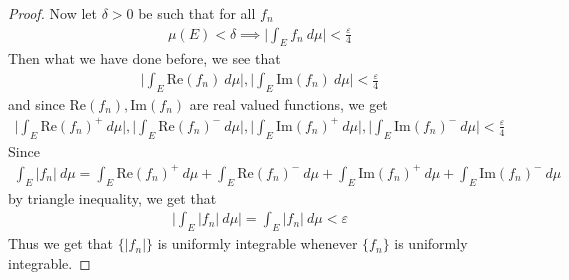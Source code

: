 \documentclass[12pt]{exam}
\theoremstyle{plain} %
\theoremstyle{definition} %
\theoremstyle{remark} %
\begin{document}
\begin{questions}
\begin{solution}
\begin{proof}
      Now let $\delta > 0$ be such that for all $f_n$
      \begin{align*}
        \mu(E) < \delta \implies \Bigg| \int_E f_n \ d \mu \Bigg| <
        \frac{\varepsilon}{4}
      \end{align*}
      Then what we have done before, we see that
      \begin{align*}
        \Bigg |\int_E \textrm{Re}(f_n) \ d \mu
        \Bigg| , \Bigg| \int_E
        \textrm{Im}(f_n) \ d \mu \Bigg| < \frac{\varepsilon}{4}
      \end{align*}
      and since $\textrm{Re}(f_n), \textrm{Im}(f_n)$ are real valued
      functions, we get
      \begin{align*}
        \Bigg| \int_E \textrm{Re}(f_n)^+ \ d \mu
        \Bigg|, \Bigg| \int_E \textrm{Re}(f_n)^- \ d \mu \Bigg|, \Bigg|
        \int_E \textrm{Im}(f_n)^+ \ d \mu \Bigg|, \Bigg| \int_E
        \textrm{Im}(f_n)^- \ d \mu \Bigg| < \frac{\varepsilon}{4}
      \end{align*}
      Since
      \begin{align*}
        \int_E |f_n| \ d \mu = \int_E \textrm{Re}(f_n)^+ \ d \mu + \int_E
        \textrm{Re}(f_n)^- \ d \mu + \int_E \textrm{Im}(f_n)^+ \ d \mu +
        \int_E \textrm{Im}(f_n)^- \ d \mu
      \end{align*}
      by triangle inequality, we get that
      \begin{align*}
        \Bigg|\int_E |f_n| \ d \mu \Bigg| = \int_E |f_n| \ d \mu  <
        \varepsilon
      \end{align*}
      Thus we get that $\{|f_n|\}$ is uniformly integrable whenever $\{
      f_n \}$ is uniformly integrable.
    \end{proof}


\end{solution}
\end{questions}
\end{document}
